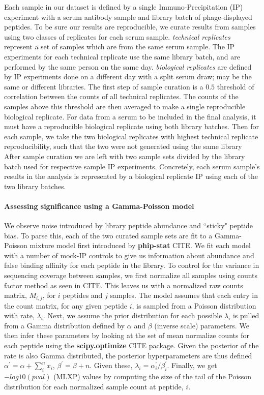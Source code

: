 \documentclass{article}
\begin{document}
Each sample in our dataset is defined by a single Immuno-Precipitation (IP) experiment with a serum antibody sample and library batch of phage-displayed peptides.
To be sure our results are reproducible, we curate results from samples using two classes of replicates for each serum sample. 
\textit{technical replicates} represent a set of samples which are from the same serum sample. 
The IP experiments for each technical replicate use the same library batch, and are performed by the same person on the same day.
\textit{biological replicates} are defined by IP experiments done on a different day with a split serum draw; may be the same or different libraries.
The first step of sample curation is a $0.5$ threshold of correlation between the counts of all technical replicates.
The counts of the samples above this threshold are then averaged to make a single reproducible biological replicate.
For data from a serum to be included in the final analysis, it must have a reproducible biological replicate using both library batches.
Then for each sample, we take the two biological replicates with highest technical replicate reproducibility, 
such that the two were not generated using the same library 
After sample curation we are left with two sample sets divided by the library batch used for respective sample IP experiments.
Concretely, each serum sample's results in the analysis is represented by a biological replicate IP using each of the two library batches.

\paragraph{Assessing significance using a Gamma-Poisson model}

We observe noise introduced by library peptide abundance and ``sticky" peptide bias.
To parse this, each of the two curated sample sets are fit to a Gamma-Poisson mixture model first introduced by \textbf{phip-stat} CITE\cite{}.
We fit each model with a number of mock-IP controls to give us information 
about abundance and false binding affinity for each peptide in the library.
To control for the variance in sequencing coverage between samples, we first normalize all samples
using counts factor method as seen in CITE\cite{}.
This leaves us with a normalized raw counts matrix, $M_{i,j}$, for $i$ peptides and $j$ samples.
The model assumes that each entry in the count matrix, for any given peptide $i$, is sampled from a Poisson distribution with rate, $\lambda_{i}$.
Next, we assume the prior distribution for each possible $\lambda_{i}$ is pulled from a Gamma distribution 
defined by $\alpha$ and $\beta$ (inverse scale) parameters.
We then infer these parameters by looking at the set of mean normalize counts for each peptide
using the \textbf{scipy.optimize} CITE\cite{} package.
Given the posterior of the rate is also Gamma distributed, the posterior hyperparameters are thus defined
$\alpha^{'} = \alpha + \sum_{i}^{n}x_{i}$, $\beta^{'} = \beta + n$.
Given these, $\lambda_{i} = \alpha^{'}_{i}/\beta^{'}_{i}$.
Finally, we get $-log10(pval)$ (MLXP) values by computing the size of the tail of the Poisson distribution for each normalized sample count at peptide, $i$.
\end{document}
